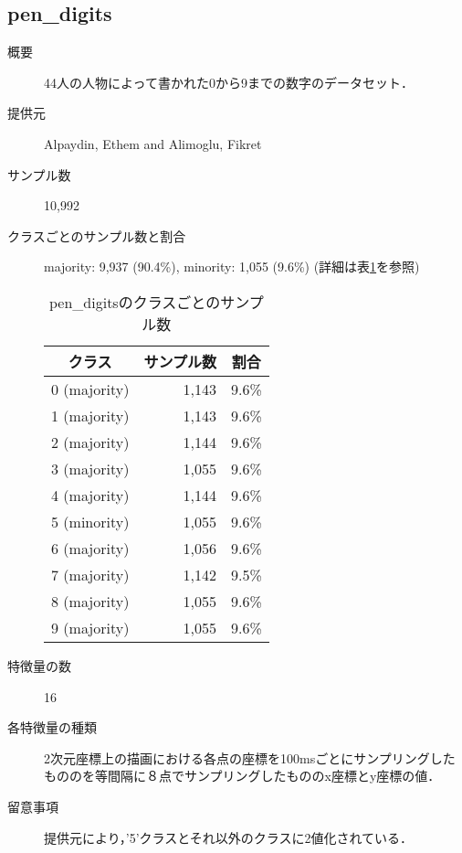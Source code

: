 \subsection{pen\_digits}
\begin{description}
    \item[概要] 44人の人物によって書かれた0から9までの数字のデータセット．\cite{pendigits}
    \item[提供元] Alpaydin, Ethem and Alimoglu, Fikret
    \item[サンプル数] 10,992
    \item[クラスごとのサンプル数と割合] majority: 9,937 (90.4\%), minority: 1,055 (9.6\%) (詳細は表\ref{tab:pendigits}を参照)
        \begin{table}[htbp]
            \centering
            \caption{pen\_digitsのクラスごとのサンプル数}
            \label{tab:pendigits}
            \begin{tabular}{lrc} \hline
                \multicolumn{1}{c}{クラス}&
                \multicolumn{1}{c}{サンプル数}&
                \multicolumn{1}{c}{割合}\\
                \hline
                \hline
                0 (majority)& 1,143 & 9.6\% \\
                1 (majority)& 1,143 & 9.6\% \\
                2 (majority)& 1,144 & 9.6\% \\
                3 (majority)& 1,055 & 9.6\% \\
                4 (majority)& 1,144 & 9.6\% \\
                5 (minority)& 1,055 & 9.6\% \\
                6 (majority)& 1,056 & 9.6\% \\
                7 (majority)& 1,142 & 9.5\% \\
                8 (majority)& 1,055 & 9.6\% \\
                9 (majority)& 1,055 & 9.6\% \\
                \hline
            \end{tabular}
        \end{table}
    \item[特徴量の数] 16
    \item[各特徴量の種類] \mbox{}
        2次元座標上の描画における各点の座標を100msごとにサンプリングしたもののを等間隔に８点でサンプリングしたもののx座標とy座標の値．
    \item[留意事項]  提供元により，'5'クラスとそれ以外のクラスに2値化されている．
\end{description}

